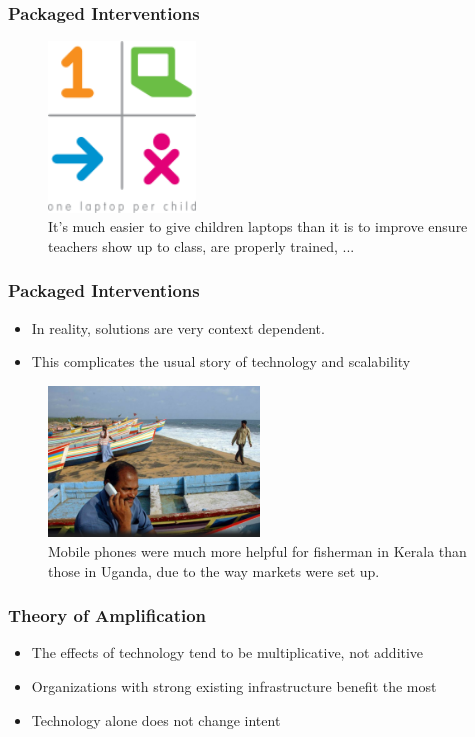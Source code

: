 \documentclass[10pt,mathserif]{beamer}
\begin{document}
\begin{frame}
  \frametitle{Packaged Interventions}
\begin{figure}[ht]
  \centering
  \includegraphics[width=0.35\textwidth]{figures/one_laptop}
  \caption{It's much easier to give children laptops than it is to improve
    ensure teachers show up to class, are properly trained, ... \label{fig:label} }
\end{figure}
\end{frame}

\begin{frame}
  \frametitle{Packaged Interventions}
  \begin{itemize}
  \item In reality, solutions are very context dependent.
  \item This complicates the usual story of technology and scalability
  \end{itemize}
  \begin{figure}[ht]
    \centering
    \includegraphics[width=0.5\textwidth]{figures/fisherman}
    \caption{Mobile phones were much more helpful for fisherman in Kerala than
      those in Uganda, due to the way markets were set up. \label{fig:label} }
  \end{figure}

\end{frame}

\begin{frame}
  \frametitle{Theory of Amplification \citep{toyama2015geek}}
  \begin{itemize}
  \item The effects of technology tend to be multiplicative, not additive
  \item Organizations with strong existing infrastructure benefit the most
  \item Technology alone does not change intent
  \end{itemize}
\end{frame}
\end{document}
